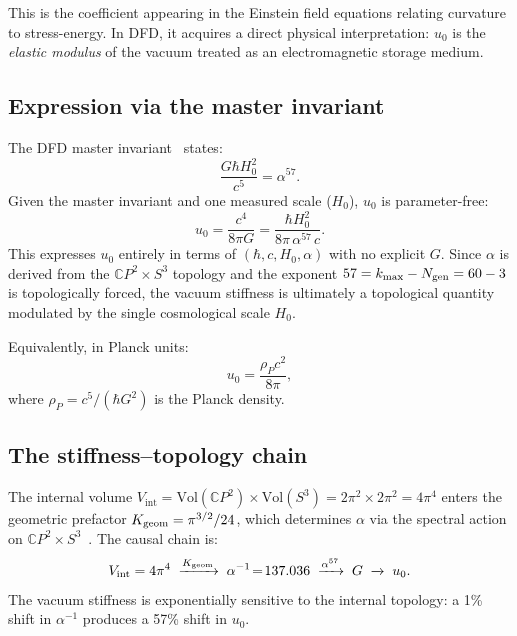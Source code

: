 \documentclass[aps,prd,twocolumn,superscriptaddress,nofootinbib]{revtex4-2}
\newcommand{\CP}{\mathbb{C}P}
\newcommand{\Vint}{V_{\mathrm{int}}}
\begin{document}
This is the coefficient appearing in the Einstein field equations
relating curvature to stress-energy.  In DFD, it acquires a direct
physical interpretation: $u_0$ is the \emph{elastic modulus} of the
vacuum treated as an electromagnetic storage medium.

\subsection{Expression via the master invariant}

The DFD master invariant~\cite{Alcock2025AbInitio} states:
\begin{equation}
\frac{G\hbar H_0^2}{c^5} = \alpha^{57}.
\label{eq:master-invariant}
\end{equation}
Given the master invariant and one measured scale ($H_0$), $u_0$ is
parameter-free:
\begin{equation}
u_0 = \frac{c^4}{8\pi G}
= \frac{\hbar H_0^2}{8\pi\,\alpha^{57}\,c}.
\label{eq:u0-from-invariant}
\end{equation}
This expresses $u_0$ entirely in terms of $(\hbar, c, H_0, \alpha)$
with no explicit $G$.  Since $\alpha$ is derived from the $\CP^2
\times S^3$ topology and the exponent $57 = k_{\max} - N_{\rm gen} =
60 - 3$ is topologically forced, the vacuum stiffness is ultimately a
topological quantity modulated by the single cosmological scale $H_0$.

Equivalently, in Planck units:
\begin{equation}
u_0 = \frac{\rho_P c^2}{8\pi},
\label{eq:u0-planck}
\end{equation}
where $\rho_P = c^5/(\hbar G^2)$ is the Planck density.

\subsection{The stiffness--topology chain}

The internal volume
$\Vint = \mathrm{Vol}(\CP^2)\times\mathrm{Vol}(S^3)
= 2\pi^2 \times 2\pi^2 = 4\pi^4$
enters the geometric prefactor
$K_{\rm geom} = \pi^{3/2}/24$, which determines $\alpha$ via the
spectral action on $\CP^2 \times S^3$~\cite{Alcock2025AbInitio}.  The
causal chain is:
\begin{equation}
\Vint = 4\pi^4
\;\xrightarrow{K_{\rm geom}}\; \alpha^{-1} \!=\! 137.036
\;\xrightarrow{\alpha^{57}}\; G
\;\xrightarrow{}\; u_0.
\end{equation}
The vacuum stiffness is exponentially sensitive to the internal
topology: a 1\% shift in $\alpha^{-1}$ produces a 57\% shift in $u_0$.
\end{document}
